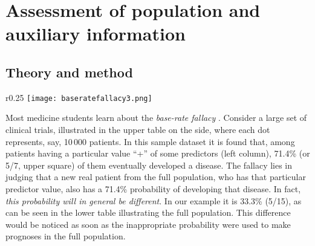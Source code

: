 \documentclass[utf8]{FrontiersinHarvard} %
\renewcommand*{\|}[1][]{\nonscript\:#1\vert\nonscript\:\mathopen{}}
\begin{document}


\clearpage
\section{Assessment of population and auxiliary information}
\label{sec:population_step}

\subsection{Theory and method}
\label{sec:populationprior_theory}


\setlength{\intextsep}{0ex}%
\setlength{\columnsep}{1ex}%
\begin{wrapfigure}{r}{0.25\linewidth}%
\texttt{[image: baseratefallacy3.png]}%
\end{wrapfigure}%
Most medicine students learn about the \emph{base-rate fallacy} \citep{barhillel1980,jennyetal2018,sprengeretal2021,matthews1996}. Consider a large set of clinical trials, illustrated in the upper table on the side, where each dot represents, say, 10\,000 patients. In this sample dataset it is found that, among patients having a particular value \enquote{+} of some predictors (left column), 71.4\% (or 5/7, upper square) of them eventually developed a disease. The fallacy lies in judging that a new real patient from the full population, who has that particular predictor value, also has a 71.4\% probability of developing that disease. In fact, \emph{this probability will in general be different}. In our example it is 33.3\% (5/15), as can be seen in the lower table illustrating the full population. This difference would be noticed as soon as the inappropriate probability were used to make prognoses in the full population.
\end{document}

